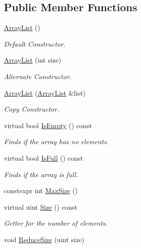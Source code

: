 \subsection*{Public Member Functions}
\begin{DoxyCompactItemize}
\item 
\hyperlink{classutil_1_1ArrayList_ac1b4f10c45a0fb0fd56c6f923d209d9c}{Array\+List} ()
\begin{DoxyCompactList}\small\item\em Default Constructor. \end{DoxyCompactList}\item 
\hyperlink{classutil_1_1ArrayList_aafcc495cef650c37932106bd19d82af6}{Array\+List} (int size)
\begin{DoxyCompactList}\small\item\em Alternate Constructor. \end{DoxyCompactList}\item 
\hyperlink{classutil_1_1ArrayList_ad2358386b361aa4887ac558d81f1c049}{Array\+List} (\hyperlink{classutil_1_1ArrayList}{Array\+List} \&list)
\begin{DoxyCompactList}\small\item\em Copy Constructor. \end{DoxyCompactList}\item 
virtual bool \hyperlink{classutil_1_1ArrayList_a8e33bd4f9e6a67140696cf24b8cc66b1}{Is\+Empty} () const
\begin{DoxyCompactList}\small\item\em Finds if the array has no elements. \end{DoxyCompactList}\item 
virtual bool \hyperlink{classutil_1_1ArrayList_a09c81f9117f52503ee49e335c44fdd63}{Is\+Full} () const
\begin{DoxyCompactList}\small\item\em Finds if the array is full. \end{DoxyCompactList}\item 
constexpr int \hyperlink{classutil_1_1ArrayList_a272326016b27e5e48f0112a468b1f7b2}{Max\+Size} ()
\item 
virtual uint \hyperlink{classutil_1_1ArrayList_ae098e879892c23b682edc4b023a770de}{Size} () const
\begin{DoxyCompactList}\small\item\em Getter for the number of elements. \end{DoxyCompactList}\item 
void \hyperlink{classutil_1_1ArrayList_abd8439644f4bff823f69a3ba9a6b66ca}{Reduce\+Size} (uint size)

\end{DoxyCompactItemize}
